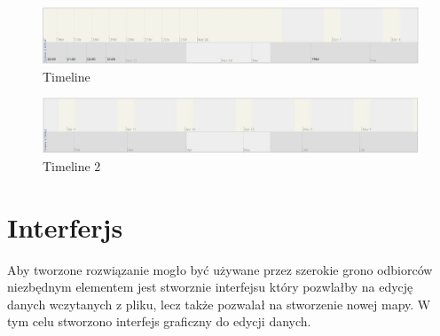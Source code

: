   \begin{figure}[H]
  \centering
    \includegraphics[width=150mm]{ge/tm1.jpg}
  \caption{Timeline}
  \label{fig:tm1}
\end{figure}

  \begin{figure}[H]
  \centering
    \includegraphics[width=150mm]{ge/tm2.jpg}
  \caption{Timeline 2}
  \label{fig:tm2}
\end{figure}

\section{Interferjs}
\label{sec:Interferjs}

Aby tworzone rozwiązanie mogło być używane przez szerokie grono odbiorców niezbędnym elementem jest stworznie interfejsu który pozwlałby na edycję danych wczytanych z pliku, lecz także pozwalał na stworzenie nowej mapy. W tym celu stworzono interfejs graficzny do edycji danych.
